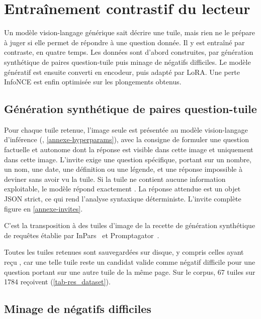 \section{Entraînement contrastif du lecteur}
\label{sec-contrastif}
 
Un modèle vision-langage générique sait décrire une tuile, mais rien ne le
prépare à juger si elle permet de répondre à une question donnée. Il y est
entraîné par contraste, en quatre temps. Les données sont d'abord construites,
par génération synthétique de paires question-tuile puis minage de négatifs
difficiles. Le modèle génératif est ensuite converti en encodeur, puis adapté
par LoRA. Une perte InfoNCE est enfin optimisée sur les plongements obtenus.
 
\subsection{Génération synthétique de paires question-tuile}
\label{sec-contrastif_qa}
 
Pour chaque tuile retenue, l'image seule est présentée au modèle vision-langage
d'inférence (, \cref{annexe-hyperparams}), avec la consigne de
formuler une question factuelle et autonome dont la réponse est visible dans
cette image et uniquement dans cette image. L'invite exige une question
spécifique, portant sur un nombre, un nom, une date, une définition ou une
légende, et une réponse impossible à deviner sans avoir vu la tuile. Si la tuile
ne contient aucune information exploitable, le modèle répond exactement
. La réponse attendue est un objet JSON strict, ce qui rend l'analyse
syntaxique déterministe. L'invite complète figure en \cref{annexe-invites}.
 
C'est la transposition à des tuiles d'image de la recette de génération
synthétique de requêtes établie par InPars~\citep{inpars2022} et
Promptagator~\citep{promptagator2022}.
 
Toutes les tuiles retenues sont sauvegardées sur disque, y compris celles ayant
reçu , car une telle tuile reste un candidat valide comme négatif
difficile pour une question portant sur une autre tuile de la même page. Sur le
corpus, \num{67} tuiles sur \num{1784} reçoivent 
(\cref{tab-res_dataset}).
 
\subsection{Minage de négatifs difficiles}
\label{sec-contrastif_mining}
 
